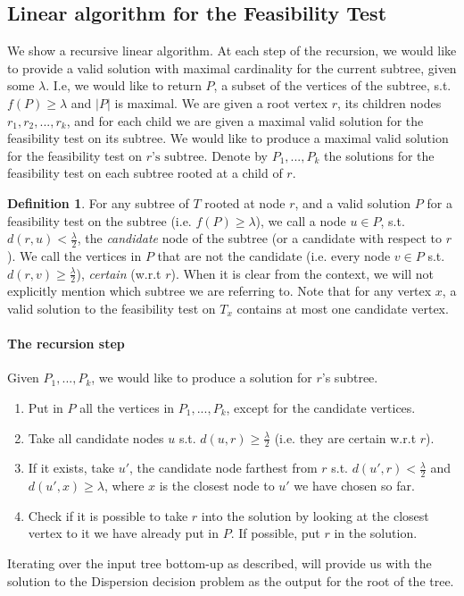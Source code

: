 \documentclass[11pt,a4paper]{article}
\newtheorem{algo}{Algorithm}[section]
\theoremstyle{definition}
\newtheorem{definition}{Definition}
\theoremstyle{remark}
\begin{document}
\subsection{Linear algorithm for the Feasibility Test}\label{linear F.T.}
We show a recursive linear algorithm.
At each step of the recursion, we would like to provide a valid solution with maximal cardinality for the current subtree, given some $\lambda$. I.e, we would like to return $P$, a subset of the vertices of the subtree, s.t. $f(P)\geq\lambda$ and $|P|$ is maximal.
We are given a root vertex $r$, its children nodes $r_{1},r_{2},...,r_{k}$, and for each child we are given a maximal valid solution for the feasibility test on its subtree. We would like to produce a maximal valid solution for the feasibility test on $r\text{'s subtree}$.
Denote by $P_{1},...,P_{k}$ the solutions for the feasibility test on each subtree rooted at a child of $r$.
\begin{definition}
For any subtree of $T$ rooted at node $r$, and a valid solution $P$ for a feasibility test on the subtree (i.e. $f(P)\geq\lambda$), we call a node $u\in P$, s.t. $d(r,u)<\frac{\lambda}{2}$, the \emph{candidate} node of the subtree (or a candidate with respect to $r$). We call the vertices in $P$ that are not the candidate (i.e. every node $v \in P$ s.t. $d(r,v)\geq \frac{\lambda}{2}$), \emph{certain} (w.r.t $r$). When it is clear from the context, we will not explicitly mention which subtree we are referring to.
Note that for any vertex $x$, a valid solution to the feasibility test on $T_x$ contains at most one candidate vertex.
\end{definition}

\paragraph{The recursion step} Given $P_{1},...,P_{k}$, we would like to produce a solution for $r$'s subtree.
\begin{enumerate}
\item Put in $P$ all the vertices in $P_{1},...,P_{k}$, except for the candidate vertices.
\item Take all candidate nodes $u$ s.t. $d(u,r) \geq \frac{\lambda}{2}$ (i.e. they are certain w.r.t $r$).
\item If it exists, take $u'$, the candidate node farthest from $r$ s.t. $d(u',r) < \frac{\lambda}{2}$ and $d(u',x)\geq \lambda$, where $x$ is the closest node to $u'$ we have chosen so far.
\item Check if it is possible to take $r$ into the solution by looking at the closest vertex to it we have already put in $P$. If possible, put $r$ in the solution.
\end{enumerate}
Iterating over the input tree bottom-up as described, will provide us with the solution to the Dispersion decision problem as the output for the root of the tree.
\end{document}
